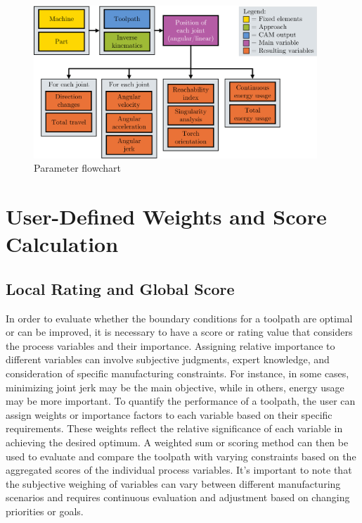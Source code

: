 \begin{figure}[H]
	\centerline{\includegraphics[width=0.95\textwidth]{figures/Flow.png}}
	\caption{Parameter flowchart}
	\label{ParamsFlow}
\end{figure}



\section{User-Defined Weights and Score Calculation}\label{weights}
\subsection{Local Rating and Global Score}\label{LR}
In order to evaluate whether the boundary conditions for a toolpath are optimal or can be improved, it is necessary to have a score or rating value that considers the process variables and their importance. Assigning relative importance to different variables can involve subjective judgments, expert knowledge, and consideration of specific manufacturing constraints. For instance, in some cases, minimizing joint jerk may be the main objective, while in others, energy usage may be more important. To quantify the performance of a toolpath, the user can assign weights or importance factors to each variable based on their specific requirements. These weights reflect the relative significance of each variable in achieving the desired optimum. A weighted sum or scoring method can then be used to evaluate and compare the toolpath with varying constraints based on the aggregated scores of the individual process variables. %
It's important to note that the subjective weighing of variables can vary between different manufacturing scenarios and requires continuous evaluation and adjustment based on changing priorities or goals.

